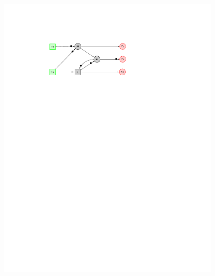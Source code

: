 \begin{figure}[!t]
	\begin{minipage}{0.6\textwidth}
	\begin{framed}
	\includegraphics[width=\textwidth]{Example.pdf}
	\end{framed}
	\end{minipage}
	\begin{minipage}{0.35\textwidth}
	\centering
	\begin{framed}

\end{framed}
\end{minipage}
\end{figure}
